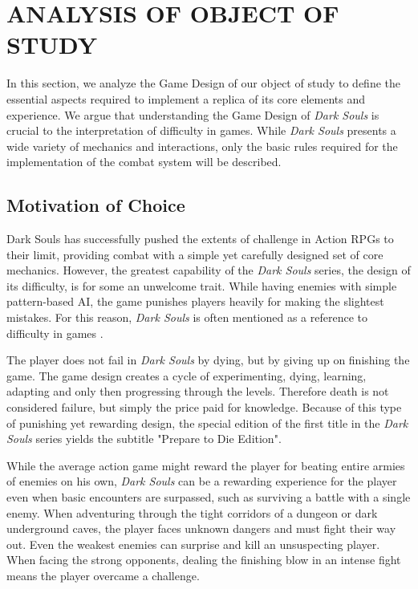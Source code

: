 \chapter{ANALYSIS OF OBJECT OF STUDY}
\label{ch:analysis-object-study}
\label{sec:analysis-dark-souls}

In this section, we analyze the Game Design of our object of study to define the essential aspects required to implement a replica of its core elements and experience. We argue that understanding the Game Design of \emph{Dark Souls} is crucial to the interpretation of difficulty in games. While \emph{Dark Souls} presents a wide variety of mechanics and interactions, only the basic rules required for the implementation of the combat system will be described.


\section{Motivation of Choice}

Dark Souls has successfully pushed the extents of challenge in Action RPGs to their limit, providing combat with a simple yet carefully designed set of core mechanics. However, the greatest capability of the \emph{Dark Souls} series, the design of its difficulty, is for some an unwelcome trait. While having enemies with simple pattern-based AI, the game punishes players heavily for making the slightest mistakes. For this reason, \emph{Dark Souls} is often mentioned as a reference to difficulty in games \cite{URL_ExploringDesignOfDarkSouls}.

The player does not fail in \emph{Dark Souls} by dying, but by giving up on finishing the game. The game design creates a cycle of experimenting, dying, learning, adapting and only then progressing through the levels. Therefore death is not considered failure, but simply the price paid for knowledge. Because of this type of punishing yet rewarding design, the special edition of the first title in the \emph{Dark Souls} series yields the subtitle "Prepare to Die Edition".

While the average action game might reward the player for beating entire armies of enemies on his own, \emph{Dark Souls} can be a rewarding experience for the player even when basic encounters are surpassed, such as surviving a battle with a single enemy. When adventuring through the tight corridors of a dungeon or dark underground caves, the player faces unknown dangers and must fight their way out. Even the weakest enemies can surprise and kill an unsuspecting player. When facing the strong opponents, dealing the finishing blow in an intense fight means the player overcame a challenge.


